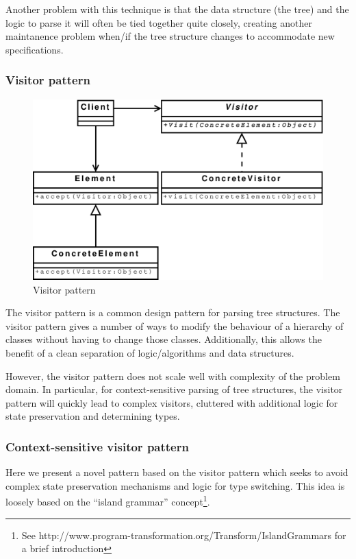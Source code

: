 Another problem with this technique is that the data structure (the tree) and
the logic to parse it will often be tied together quite closely, creating
another maintanence problem when/if the tree structure changes to
accommodate new specifications.

\subsubsection{Visitor pattern}
\label{sect:theory:visitorPattern}

\begin{figure}[h]
  \centering
    \includegraphics[scale=0.40]{diagrams/visitor_pattern} 
  \caption{Visitor pattern}
  \label{figure:parser:visitor_pattern}
\end{figure}

The visitor pattern\cite{agile_software} is a common design pattern for parsing
tree structures. The visitor pattern gives a number of ways to modify the
behaviour of a hierarchy of classes without having to change those classes.
Additionally, this allows the benefit of a clean separation of logic/algorithms
and data structures.

However, the visitor pattern does not scale well with complexity of the problem
domain. In particular, for context-sensitive parsing of tree structures, the
visitor pattern will quickly lead to complex visitors, cluttered with
additional logic for state preservation and determining types.  

\subsubsection{Context-sensitive visitor pattern}
\label{sect:theory:contextVisitorPattern}
Here we present a novel pattern based on the visitor pattern which seeks to
avoid complex state preservation mechanisms and logic for type switching. This idea
is loosely based on the ``island grammar'' concept\cite{islandGrammar}\footnote{See
http://www.program-transformation.org/Transform/IslandGrammars for a brief
introduction}.

